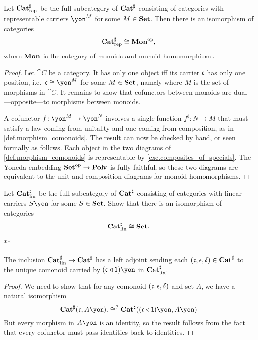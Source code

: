 \documentclass[Book-Poly]{subfiles}
\begin{document}
\begin{proposition}
Let $\mathbf{Cat}^\sharp_{\text{rep}}$ be the full subcategory of $\mathbf{Cat}^\sharp$ consisting of categories with representable carriers $\yon^M$ for some $M\in\mathbf{Set}$.
Then there is an isomorphism of categories
\[
    \mathbf{Cat}^\sharp_{\text{rep}}\cong\mathbf{Mon}^{\textnormal{op}},
\]
where $\mathbf{Mon}$ is the category of monoids and monoid homomorphisms.
\end{proposition}
\begin{proof}
Let $\cat{C}$ be a category. It has only one object iff its carrier $\mathfrak{c}$ has only one position, i.e.\ $\car{c}\cong\yon^M$ for some $M\in\mathbf{Set}$, namely where $M$ is the set of morphisms in $\cat{C}$. It remains to show that cofunctors between monoids are dual---opposite---to morphisms between monoids.

A cofunctor $f\colon\yon^M\to\yon^N$ involves a single function $f^\sharp\colon N\to M$ that must satisfy a law coming from unitality and one coming from composition, as in \cref{def.morphism_comonoids}. The result can now be checked by hand, or seen formally as follows. Each object in the two diagrams of \eqref{def.morphism_comonoids} is representable by \cref{exc.composites_of_specials}. The Yoneda embedding $\mathbf{Set}^{\textnormal{op}}\to\mathbf{Poly}$ is fully faithful, so these two diagrams are equivalent to the unit and composition diagrams for monoid homomorphisms.
\end{proof}

\begin{exercise}\label{exc.lin_comon_set}
Let $\mathbf{Cat}^\sharp_{\text{lin}}$ be the full subcategory of $\mathbf{Cat}^\sharp$ consisting of categories with linear carriers $S\yon$ for some $S\in\mathbf{Set}$.
Show that there is an isomorphism of categories
\[
\mathbf{Cat}^\sharp_{\text{lin}}\cong\mathbf{Set}.
\qedhere
\]
\begin{solution}
**
\end{solution}
\end{exercise}

\begin{proposition}
The inclusion $\mathbf{Cat}^\sharp_{\text{lin}}\to\mathbf{Cat}^\sharp$ has a left adjoint sending each $(\mathfrak{c},\epsilon,\delta)\in\mathbf{Cat}^\sharp$ to the unique comonoid carried by $(\car{c}\tri\1)\yon$ in $\mathbf{Cat}^\sharp_{\text{lin}}$.
\end{proposition}
\begin{proof}
We need to show that for any comonoid $(\mathfrak{c},\epsilon,\delta)$ and set $A$, we have a natural isomorphism
\[
  \smcat^\sharp(\car{c},A\yon).
  \cong^?
  \smcat^\sharp((\car{c}\tri\1)\yon,A\yon)
\]
But every morphism in $A\yon$ is an identity, so the result follows from the fact that every cofunctor must pass identities back to identities. 
\end{proof}
\end{document}
